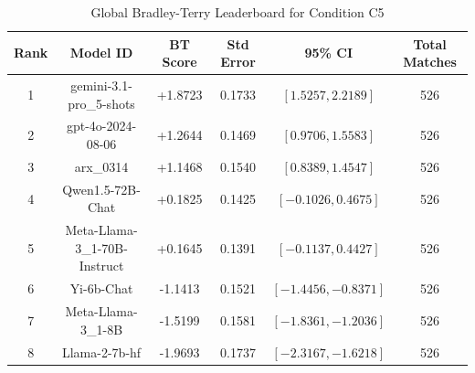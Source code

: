 \begin{table}[ht]
\centering
\caption{Global Bradley-Terry Leaderboard for Condition \textsc{C5}}
\label{tab:leaderboard_c5}
\begin{tabular}{cccccc}
\hline
\textbf{Rank} & \textbf{Model ID} & \textbf{BT Score} & \textbf{Std Error} & \textbf{95\% CI} & \textbf{Total Matches} \\
\hline
1 & gemini-3.1-pro\_5-shots & +1.8723 & 0.1733 & $[1.5257, 2.2189]$ & 526 \\
2 & gpt-4o-2024-08-06 & +1.2644 & 0.1469 & $[0.9706, 1.5583]$ & 526 \\
3 & arx\_0314 & +1.1468 & 0.1540 & $[0.8389, 1.4547]$ & 526 \\
4 & Qwen1.5-72B-Chat & +0.1825 & 0.1425 & $[-0.1026, 0.4675]$ & 526 \\
5 & Meta-Llama-3\_1-70B-Instruct & +0.1645 & 0.1391 & $[-0.1137, 0.4427]$ & 526 \\
6 & Yi-6b-Chat & -1.1413 & 0.1521 & $[-1.4456, -0.8371]$ & 526 \\
7 & Meta-Llama-3\_1-8B & -1.5199 & 0.1581 & $[-1.8361, -1.2036]$ & 526 \\
8 & Llama-2-7b-hf & -1.9693 & 0.1737 & $[-2.3167, -1.6218]$ & 526 \\
\hline
\end{tabular}
\end{table}
